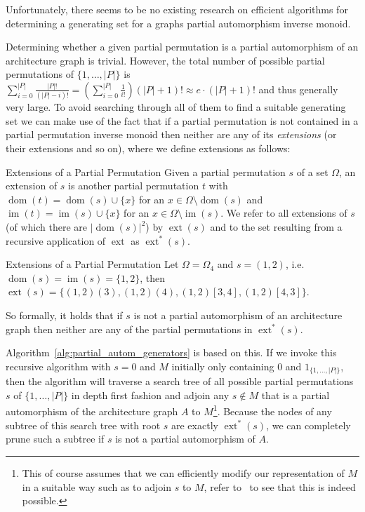 Unfortunately, there seems to be no existing research on efficient algorithms
for determining a generating set for a graphs partial automorphism inverse
monoid.

Determining whether a given partial permutation is a partial automorphism of an
architecture graph is trivial. However, the total number of possible partial
permutations of $\{1, \dots, |P|\}$ is $\sum_{i=0}^{|P|} \frac{|P|!}{(|P| -
i)!} = \left(\sum_{i=0}^{|P|} \frac{1}{i!}\right) (|P| + 1)! \approx e \cdot
(|P| + 1)!$ and thus generally very large. To avoid searching through all of
them to find a suitable generating set we can make use of the fact that if a
partial permutation is not contained in a partial permutation inverse monoid
then neither are any of its \textit{extensions} (or their extensions and so
on), where we define extensions as follows:

\begin{defn}{Extensions of a Partial Permutation}
  Given a partial permutation $s$ of a set $\Omega$, an extension of $s$ is
  another partial permutation $t$ with $\operatorname{dom}(t) =
  \operatorname{dom}(s) \cup \{x\}$ for an $x \in \Omega \setminus
  \operatorname{dom}(s)$ and $\operatorname{im}(t) = \operatorname{im}(s) \cup
  \{x\}$ for an $x \in \Omega \setminus \operatorname{im}(s)$. We refer to all
  extensions of $s$ (of which there are $|\operatorname{dom}(s)|^2$) by
  $\operatorname{ext}(s)$ and to the set resulting from a recursive application
  of $\operatorname{ext}$ as $\operatorname{ext}^*(s)$.
\end{defn}

\begin{exmp}{Extensions of a Partial Permutation}
  Let $\Omega = \Omega_4$ and $s = (1, 2)$, i.e. $\operatorname{dom}(s) =
  \operatorname{im}(s) = \{1,2\}$, then $\operatorname{ext}(s) = \{(1, 2)(3),
  (1, 2)(4), (1, 2)[3, 4], (1, 2)[4, 3]\}$.
\end{exmp}
%
So formally, it holds that if $s$ is not a partial automorphism of an
architecture graph then neither are any of the partial permutations in
$\operatorname{ext}^*(s)$.

Algorithm~\ref{alg:partial_autom_generators} is based on this. If we invoke
this recursive algorithm with $s = 0$ and $M$ initially only containing $0$ and
$1_{\{1,\dots,|P|\}}$, then the algorithm will traverse a search tree of all
possible partial permutations $s$ of $\{1, \dots, |P|\}$ in depth first
fashion and adjoin any $s \notin M$ that is a partial automorphism of the
architecture graph $A$ to $M$\footnote{This of course assumes that we can
efficiently modify our representation of $M$ in a suitable way such as to adjoin
$s$ to $M$, refer to~\cite{Mitchell} to see that this is indeed possible.}.
Because the nodes of any subtree of this search tree with root $s$ are exactly
$\operatorname{ext}^*(s)$, we can completely prune such a subtree if $s$ is not
a partial automorphism of $A$.

